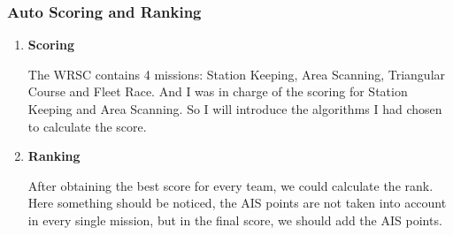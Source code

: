 \subsubsection{Auto Scoring and Ranking}
\begin{enumerate}
\item{\textbf{Scoring}}


The WRSC contains 4 missions: Station Keeping, Area Scanning, Triangular Course and Fleet Race. And I was in charge of the scoring for Station Keeping and Area Scanning. So I will introduce the algorithms I had chosen to calculate the score.
\begin{itemize}


\end{itemize} 
\item{\textbf{Ranking}}
\begin{itemize}


After obtaining the best score for every team, we could calculate the rank. Here something should be noticed, the AIS points are not taken into account in every single mission, but in the final score, we should add the AIS points.
\end{itemize}
\end{enumerate}
